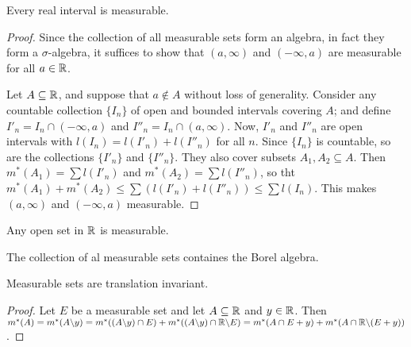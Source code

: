 \begin{lemma}\label{8.2.7}
    Every real interval is measurable.
\end{lemma}
\begin{proof}
    Since the collection of all measurable sets form an algebra, in fact they
    form a $\sigma$-algebra, it suffices to show that  $(a,\infty)$ and
    $(-\infty,a)$ are measurable for all $a \in \mathbb{R}$.

    Let  $A \subseteq \mathbb{R}$, and suppose that  $a \notin A$ without loss of
    generality. Consider any countable collection  $\{I_n\}$ of open and bounded
    intervals covering $A$; and define  $I'_n=I_n \cap (-\infty,a)$ and
    $I''_n=I_n \cap (a,\infty)$. Now, $I'_n$ and  $I''_n$ are open intervals
    with $l(I_n)=l(I'_n)+l(I''_n)$ for all $n$. Since  $\{I_n\}$ is countable,
    so are the collections $\{I'_n\}$ and $\{I''_n\}$. They also cover subsets
    $A_1,A_2 \subseteq A$. Then $m^*(A_1)=\sum{l(I'_n)}$ and
    $m^*(A_2)=\sum{l(I''_n)}$, so tht $m^*(A_1)+m^*(A_2) \leq
    \sum{(l(I'_n)+l(I''_n))} \leq \sum{l(I_n)}$. This makes $(a,\infty)$ and $
    (-\infty,a)$ measurable.
\end{proof}
\begin{corollary}
    Any open set in $\mathbb{R}$ is measurable.
\end{corollary}

\begin{theorem}\label{8.2.8}
    The collection of al measurable sets containes the Borel algebra.
\end{theorem}

\begin{lemma}\label{8.2.9}
    Measurable sets are translation invariant.
\end{lemma}
\begin{proof}
    Let $E$ be a measurable set and let  $A \subseteq \mathbb{R}$ and  $y \in \mathbb{R}$. Then
     $m^*(A)=m^*(A \backslash y)=m^*((A \backslash y) \cap E)+m^*((A \backslash y) \cap
     \mathbb{R} \backslash E)=m^*(A \cap E+y)+m^*(A \cap \mathbb{R} \backslash (E+y))$.
\end{proof}
